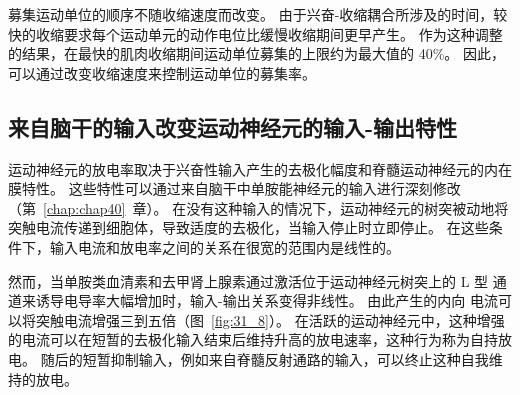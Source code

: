 募集运动单位的顺序不随收缩速度而改变。
由于兴奋-收缩耦合所涉及的时间，较快的收缩要求每个运动单元的动作电位比缓慢收缩期间更早产生。
作为这种调整的结果，在最快的肌肉收缩期间运动单位募集的上限约为最大值的 40\%。
因此，可以通过改变收缩速度来控制运动单位的募集率。



\subsection{来自脑干的输入改变运动神经元的输入-输出特性}

运动神经元的放电率取决于兴奋性输入产生的去极化幅度和脊髓运动神经元的内在膜特性。
这些特性可以通过来自脑干中单胺能神经元的输入进行深刻修改（第~\ref{chap:chap40}~章）。
在没有这种输入的情况下，运动神经元的树突被动地将突触电流传递到细胞体，导致适度的去极化，当输入停止时立即停止。
在这些条件下，输入电流和放电率之间的关系在很宽的范围内是线性的。


然而，当单胺类血清素和去甲肾上腺素通过激活位于运动神经元树突上的 L 型  通道来诱导电导率大幅增加时，输入-输出关系变得非线性。
由此产生的内向  电流可以将突触电流增强三到五倍（图~\ref{fig:31_8}）。
在活跃的运动神经元中，这种增强的电流可以在短暂的去极化输入结束后维持升高的放电速率，这种行为称为自持放电。
随后的短暂抑制输入，例如来自脊髓反射通路的输入，可以终止这种自我维持的放电。



